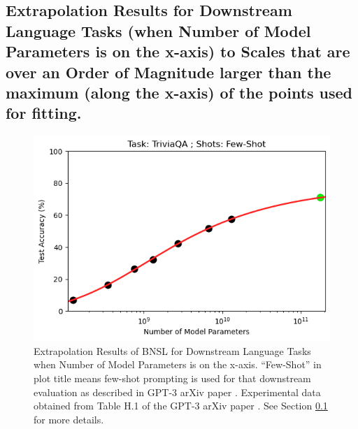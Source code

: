 \documentclass{article} %
\begin{document}
\fi

\clearpage

\subsection{Extrapolation Results for Downstream Language Tasks (when Number of Model Parameters is on the x-axis) to Scales that are over an Order of Magnitude larger than the maximum (along the x-axis) of the points used for fitting.}
\label{section:language_tasks__number_of_parameters}

\begin{figure}[htbp]
    \centering
\includegraphics[width=1.0\textwidth]{figures/gpt-3__parameter_scaling/TriviaQA___Few-Shot.png}
    \caption{
Extrapolation Results of BNSL for Downstream Language Tasks when Number of Model Parameters is on the x-axis. ``Few-Shot'' in plot title means few-shot prompting is used for that downstream evaluation as described in GPT-3 arXiv paper \citep{brown2020language}. Experimental data obtained from Table H.1 of the GPT-3 arXiv paper \citep{brown2020language}.
See Section \ref{section:language_tasks__number_of_parameters} for more details.
    }
    \label{fig:language_tasks__number_of_parameters}
\end{figure}
\end{document}
